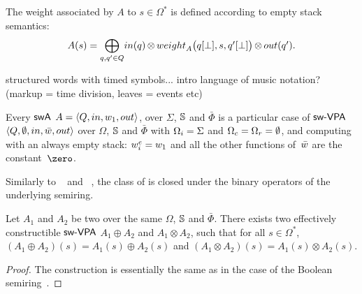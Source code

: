 %

\noindent
The weight associated by $A$ to $s \in \Omega^*$
is defined according to empty stack semantics: 
%
\begin{equation}
A(s)  = 
{\displaystyle\bigoplus_{q, q' \in Q}} \textstyle
\mathsf{in}(q) \mathop{\otimes} 
\weight_A\bigl(\config{q}{\bot}, s, \config{q'}{\bot}\bigr) 
\mathop{\otimes} \mathsf{out}(q').
\label{eq:SWVPA-value}
\end{equation}

\begin{example}
structured words with timed symbols...
intro language of music notation? (markup = time division, leaves = events etc)
\end{example}

\noindent 
Every $\textsf{swA}$ $A = \< Q, \init, {\wei_1}, \final >$,
over $\Sigma$, $\mathbb{S}$ and $\bar\Phi$
is a particular case of $\textsf{sw-VPA}$ 
$\< Q, \emptyset, \init, \bar\wei, \final >$ 
over $\Omega$, $\mathbb{S}$ and $\bar\Phi$
with $\Omegai = \Sigma$ and $\Omegac = \Omegar = \emptyset$,
and computing with an always empty stack:
$\weiei = \wei_1$ and all the other functions 
of~$\bar\wei$ are the constant~$\zero$.


\medskip\noindent
Similarly to \VPA~\cite{AlurMadhusudan09nested} 
and \SVPA~\cite{dAntonyAlur14SVPDA}, 
the class of \SWVPA is closed under the binary operators of the underlying semiring.
%
\begin{proposition}\label{prop:SWVPA-product}
Let $A_1$ and $A_2$ be two \SWVPA
over the same $\Omega$, $\mathbb{S}$ and $\bar\Phi$.
There exists two effectively constructible $\textsf{sw-VPA}$ 
$A_1 \oplus A_2$ and $A_1 \otimes A_2$,  
such that for all $s \in \Omega^*$, 
$(A_1 \oplus A_2)(s) = A_1(s) \oplus A_2(s)$ and 
$(A_1 \otimes A_2)(s) = A_1(s) \otimes A_2(s)$.
\end{proposition}
%
\begin{proof}
The construction is essentially the same 
as in the case of the Boolean semiring~\cite{dAntonyAlur14SVPDA}.
\end{proof}

